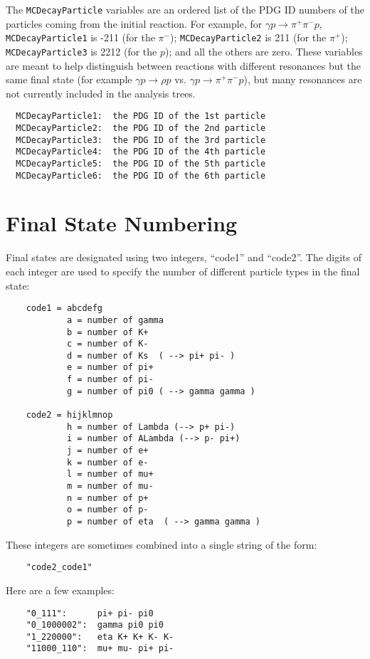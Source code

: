 \documentclass[11pt]{article}
\begin{document}
The {\tt MCDecayParticle} variables are an ordered list of the PDG ID numbers of the particles coming from the initial reaction.
For example, for $\gamma p \to \pi^+ \pi^- p$,
{\tt MCDecayParticle1} is -211 (for the $\pi^-$);
{\tt MCDecayParticle2} is 211 (for the $\pi^+$);
{\tt MCDecayParticle3} is 2212 (for the $p$);
and all the others are zero.
These variables are meant to help distinguish between reactions with different resonances but the same final state (for example $\gamma p \to \rho p$ vs. $\gamma p \to \pi^+ \pi^- p$), but many resonances are not currently included in the analysis trees.

\begin{verbatim}
  MCDecayParticle1:  the PDG ID of the 1st particle
  MCDecayParticle2:  the PDG ID of the 2nd particle
  MCDecayParticle3:  the PDG ID of the 3rd particle
  MCDecayParticle4:  the PDG ID of the 4th particle
  MCDecayParticle5:  the PDG ID of the 5th particle
  MCDecayParticle6:  the PDG ID of the 6th particle
\end{verbatim}

\section{Final State Numbering}
\label{sec:numbering}

Final states are designated using two integers, ``code1'' and ``code2''.  The digits of each integer are used to specify the number of different particle types in the final state:
\begin{verbatim}
    code1 = abcdefg
            a = number of gamma
            b = number of K+
            c = number of K-
            d = number of Ks  ( --> pi+ pi- )
            e = number of pi+
            f = number of pi-
            g = number of pi0 ( --> gamma gamma )

    code2 = hijklmnop
            h = number of Lambda (--> p+ pi-)
            i = number of ALambda (--> p- pi+)
            j = number of e+
            k = number of e-
            l = number of mu+
            m = number of mu-
            n = number of p+
            o = number of p-
            p = number of eta  ( --> gamma gamma )
\end{verbatim}
These integers are sometimes combined into a single string of the form:
\begin{verbatim}
    "code2_code1"
\end{verbatim}
Here are a few examples:
\begin{verbatim}
    "0_111":      pi+ pi- pi0
    "0_1000002":  gamma pi0 pi0
    "1_220000":   eta K+ K+ K- K-
    "11000_110":  mu+ mu- pi+ pi-
\end{verbatim}
\end{document}
